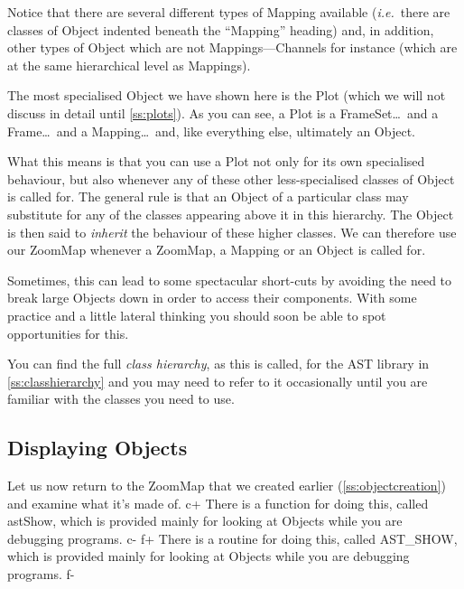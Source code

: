 \documentclass[twoside,11pt]{article}
\newcommand{\appref}[1]{Appendix~\ref{#1}}
\newcommand{\secref}[1]{\S\ref{#1}}
\renewcommand{\appref}[1]{\ref{#1}}
\renewcommand{\secref}[1]{\ref{#1}}
\begin{document}
Notice that there are several different types of Mapping available
({\em{i.e.}}\ there are classes of Object indented beneath the
``Mapping'' heading) and, in addition, other types of Object which are
not Mappings---Channels for instance (which are at the same
hierarchical level as Mappings).

The most specialised Object we have shown here is the Plot (which we
will not discuss in detail until \secref{ss:plots}). As you can see, a
Plot is a FrameSet\ldots\ and a Frame\ldots\ and a Mapping\ldots\ and,
like everything else, ultimately an Object.

What this means is that you can use a Plot not only for its own
specialised behaviour, but also whenever any of these other
less-specialised classes of Object is called for. The general rule is
that an Object of a particular class may substitute for any of the
classes appearing above it in this hierarchy. The Object is then said
to {\em{inherit}} the behaviour of these higher classes. We can
therefore use our ZoomMap whenever a ZoomMap, a Mapping or an Object
is called for.

Sometimes, this can lead to some spectacular short-cuts by avoiding
the need to break large Objects down in order to access their
components. With some practice and a little lateral thinking you
should soon be able to spot opportunities for this.

You can find the full {\em{class hierarchy}}, as this is called, for
the AST library in \appref{ss:classhierarchy} and you may need to
refer to it occasionally until you are familiar with the classes you
need to use.

\subsection{\label{ss:displayingobjects}Displaying Objects}

Let us now return to the ZoomMap that we created earlier
(\secref{ss:objectcreation}) and examine what it's made of.
c+
There is a function for doing this, called astShow, which is provided
mainly for looking at Objects while you are debugging programs.
c-
f+
There is a routine for doing this, called AST\_SHOW, which is provided
mainly for looking at Objects while you are debugging programs.
f-
\end{document}
